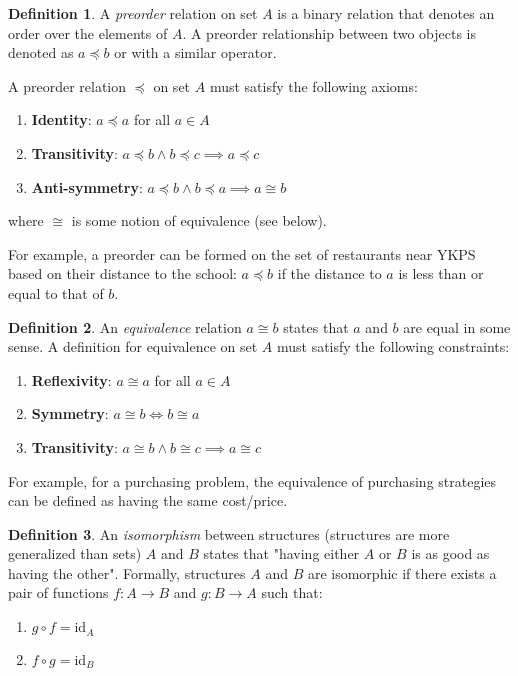 \documentclass[12pt]{article}
\theoremstyle{definition}
\newtheorem{defn}{Definition}[section]
\newcommand{\id}[1]{\text{id}_{#1}}
\begin{document}
	\begin{defn}
		A \emph{preorder} relation on set $A$ is a binary relation that denotes an order over the elements of $A$. A preorder relationship between two objects is denoted as $a \preceq b$ or with a similar operator.
		
		A preorder relation $\preceq$ on set $A$ must satisfy the following axioms:
		\begin{enumerate}
			\item \textbf{Identity}: $a \preceq a$ for all $a \in A$
			\item \textbf{Transitivity}: $a \preceq b \land b \preceq c \implies a \preceq c$
			\item \textbf{Anti-symmetry}: $a \preceq b \land b \preceq a \implies a \cong b$
		\end{enumerate}
		where $\cong$ is some notion of equivalence (see below).
 	\end{defn}
 	
 	For example, a preorder can be formed on the set of restaurants near YKPS based on their distance to the school: $a \preceq b$ if the distance to $a$ is less than or equal to that of $b$.
 	
 	\begin{defn}
 		An \emph{equivalence} relation $a \cong b$ states that $a$ and $b$ are equal in some sense. A definition for equivalence on set $A$ must satisfy the following constraints:
 		\begin{enumerate}
 			\item \textbf{Reflexivity}: $a \cong a$ for all $a \in A$
 			\item \textbf{Symmetry}: $a \cong b \iff b \cong a$
 			\item \textbf{Transitivity}: $a \cong b \land b \cong c \implies a \cong c$
 		\end{enumerate}
 	\end{defn}
 	
 	For example, for a purchasing problem, the equivalence of purchasing strategies can be defined as having the same cost/price.
 	
 	\begin{defn}
 		An \emph{isomorphism} between structures (structures are more generalized than sets) $A$ and $B$ states that "having either $A$ or $B$ is as good as having the other". Formally, structures $A$ and $B$ are isomorphic if there exists a pair of functions $f : A \to B$ and $g : B \to A$ such that:
 		\begin{enumerate}
 			\item $g \circ f = \id{A}$
 			\item $f \circ g = \id{B}$
 		\end{enumerate}
 	\end{defn}
 	
\end{document}
